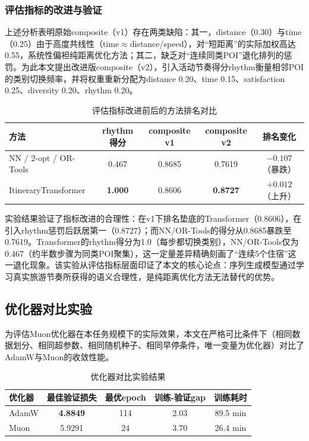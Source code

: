 \documentclass[12pt,a4paper]{ctexart}
\newenvironment{tighttable}
  {\setstretch{1.0}\small}
  {}
\begin{document}
\subsubsection{评估指标的改进与验证}

上述分析表明原始composite（v1）存在两类缺陷：其一，distance（0.30）与time（0.25）由于高度共线性（time$\approx$distance/speed），对“短距离”的实际加权高达0.55，系统性偏袒纯距离优化方法；其二，缺乏对“连续同类POI”退化排列的惩罚。为此本文提出改进版composite（v2），引入活动节奏得分rhythm衡量相邻POI的类别切换频率，并将权重重新分配为distance 0.20、time 0.15、satisfaction 0.25、diversity 0.20、rhythm 0.20。

\begin{table}[H]
\centering
\caption{评估指标改进前后的方法排名对比}
\label{tab:composite_v2}
\begin{tighttable}
\begin{tabular}{lcccc}
\toprule
方法 & rhythm得分 & composite v1 & composite v2 & 排名变化 \\
\midrule
NN / 2-opt / OR-Tools & 0.467 & 0.8685 & 0.7619 & $-0.107$（暴跌） \\
ItineraryTransformer & \textbf{1.000} & 0.8606 & \textbf{0.8727} & $+0.012$（上升） \\
\bottomrule
\end{tabular}
\end{tighttable}
\end{table}

实验结果验证了指标改进的合理性：在v1下排名垫底的Transformer（0.8606），在引入rhythm惩罚后跃居第一（0.8727）；而NN/OR-Tools的得分从0.8685暴跌至0.7619。Transformer的rhythm得分为1.0（每步都切换类别），NN/OR-Tools仅为0.467（约半数步骤为同类POI聚集），这一定量差异精确刻画了“连续5个住宿”这一退化现象。该实验从评估指标层面印证了本文的核心论点：序列生成模型通过学习真实旅游节奏所获得的语义合理性，是纯距离优化方法无法替代的优势。

\subsection{优化器对比实验}
\label{sec:optimizer}

为评估Muon优化器在本任务规模下的实际效果，本文在严格可比条件下（相同数据划分、相同超参数、相同随机种子、相同早停条件，唯一变量为优化器）对比了AdamW与Muon的收敛性能。

\begin{table}[H]
\centering
\caption{优化器对比实验结果}
\label{tab:optimizer_comparison}
\begin{tighttable}
\begin{tabular}{lcccc}
\toprule
优化器 & 最佳验证损失 & 最优epoch & 训练-验证gap & 训练耗时 \\
\midrule
AdamW & \textbf{4.8849} & 114 & 2.03 & 89.5 min \\
Muon & 5.9291 & 24 & 3.70 & 26.4 min \\
\bottomrule
\end{tabular}
\end{tighttable}
\end{table}
\end{document}
